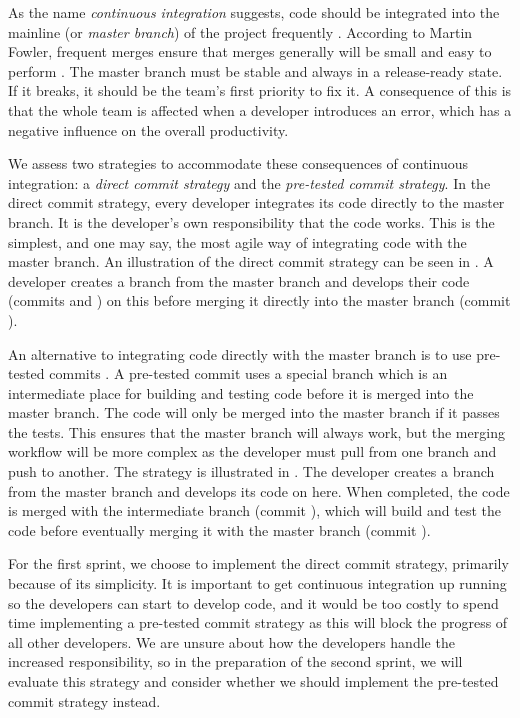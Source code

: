 As the name \emph{continuous integration} suggests, code should be integrated into the mainline (or \emph{master branch}) of the project frequently \parencite{fowlerCI}. According to Martin Fowler, frequent merges ensure that merges generally will be small and easy to perform \parencite{fowlerFeatureBranch}. The master branch must be stable and always in a release-ready state. If it breaks, it should be the team's first priority to fix it. A consequence of this is that the whole team is affected when a developer introduces an error, which has a negative influence on the overall productivity.

We assess two strategies to accommodate these consequences of continuous integration: a \emph{direct commit strategy} and the \emph{pre-tested commit strategy}. In the direct commit strategy, every developer integrates its code directly to the master branch. It is the developer's own responsibility that the code works. This is the simplest, and one may say, the most agile way of integrating code with the master branch. An illustration of the direct commit strategy can be seen in . A developer creates a branch from the master branch and develops their code (commits  and ) on this before merging it directly into the master branch (commit ).

An alternative to integrating code directly with the master branch is to use pre-tested commits \parencite{fowlerPendingHead}. A pre-tested commit uses a special branch which is an intermediate place for building and testing code before it is merged into the master branch. The code will only be merged into the master branch if it passes the tests. This ensures that the master branch will always work, but the merging workflow will be more complex as the developer must pull from one branch and push to another. The strategy is illustrated in . The developer creates a branch from the master branch and develops its code on here. When completed, the code is merged with the intermediate branch (commit \emph{}), which will build and test the code before eventually merging it with the master branch (commit ).

For the first sprint, we choose to implement the direct commit strategy, primarily because of its simplicity. It is important to get continuous integration up running so the developers can start to develop code, and it would be too costly to spend time implementing a pre-tested commit strategy as this will block the progress of all other developers. We are unsure about how the developers handle the increased responsibility, so in the preparation of the second sprint, we will evaluate this strategy and consider whether we should implement the pre-tested commit strategy instead.

